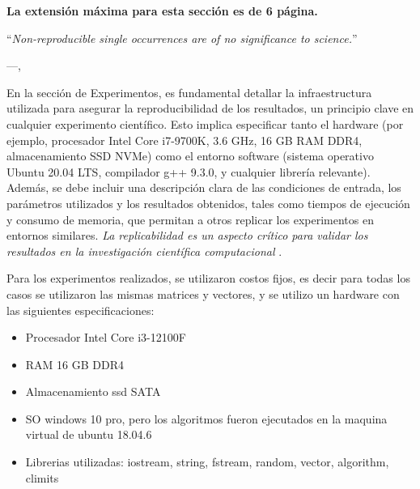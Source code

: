 \begin{mdframed}
    \textbf{La extensión máxima para esta sección es de 6 página.}
\end{mdframed}


\epigraph{``\textit{Non-reproducible single occurrences are of no significance to
science.}''}{---\citeauthor{popper2005logic},\citeyear{popper2005logic} \cite{popper2005logic}}

En la sección de Experimentos, es fundamental detallar la infraestructura utilizada para asegurar la reproducibilidad de los resultados, un principio clave en cualquier experimento científico. Esto implica especificar tanto el hardware (por ejemplo, procesador Intel Core i7-9700K, 3.6 GHz, 16 GB RAM DDR4, almacenamiento SSD NVMe) como el entorno software (sistema operativo Ubuntu 20.04 LTS, compilador g++ 9.3.0, y cualquier librería relevante). Además, se debe incluir una descripción clara de las condiciones de entrada, los parámetros utilizados y los resultados obtenidos, tales como tiempos de ejecución y consumo de memoria, que permitan a otros replicar los experimentos en entornos similares. \textit{La replicabilidad es un aspecto crítico para validar los resultados en la investigación científica computacional} \cite{inbookFonseca}.

Para los experimentos realizados, se utilizaron costos fijos, es decir para todas los casos se utilizaron las mismas matrices y vectores, y se utilizo un hardware con las siguientes especificaciones:
\begin{itemize}
    \item Procesador Intel Core i3-12100F
    \item RAM 16 GB DDR4
    \item Almacenamiento ssd SATA
    \item SO windows 10 pro, pero los algoritmos fueron ejecutados en la maquina virtual de ubuntu 18.04.6
    \item Librerias utilizadas: iostream, string, fstream, random, vector, algorithm, climits

\end{itemize}